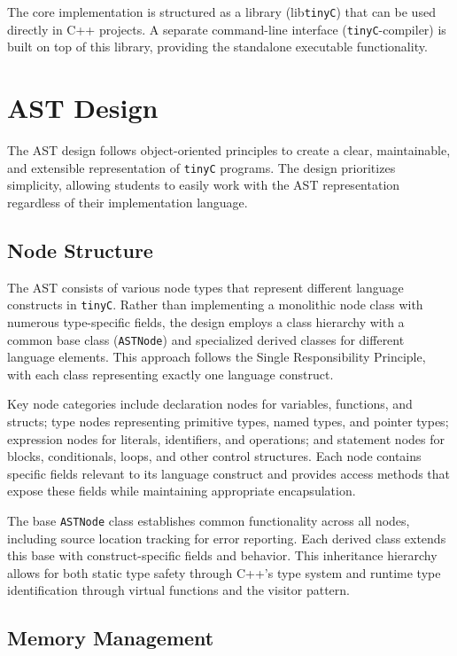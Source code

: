 The core implementation is structured as a library (lib\texttt{tinyC}) that can be used directly in C++ projects. A separate command-line interface (\texttt{tinyC}-compiler) is built on top of this library, providing the standalone executable functionality.

\section{AST Design}

The AST design follows object-oriented principles to create a clear, maintainable, and extensible representation of \texttt{tinyC} programs. The design prioritizes simplicity, allowing students to easily work with the AST representation regardless of their implementation language.

\subsection{Node Structure}

The AST consists of various node types that represent different language constructs in \texttt{tinyC}. Rather than implementing a monolithic node class with numerous type-specific fields, the design employs a class hierarchy with a common base class (\texttt{ASTNode}) and specialized derived classes for different language elements. This approach follows the Single Responsibility Principle, with each class representing exactly one language construct.

Key node categories include declaration nodes for variables, functions, and structs; type nodes representing primitive types, named types, and pointer types; expression nodes for literals, identifiers, and operations; and statement nodes for blocks, conditionals, loops, and other control structures. Each node contains specific fields relevant to its language construct and provides access methods that expose these fields while maintaining appropriate encapsulation.

The base \texttt{ASTNode} class establishes common functionality across all nodes, including source location tracking for error reporting. Each derived class extends this base with construct-specific fields and behavior. This inheritance hierarchy allows for both static type safety through C++'s type system and runtime type identification through virtual functions and the visitor pattern.

\subsection{Memory Management}

